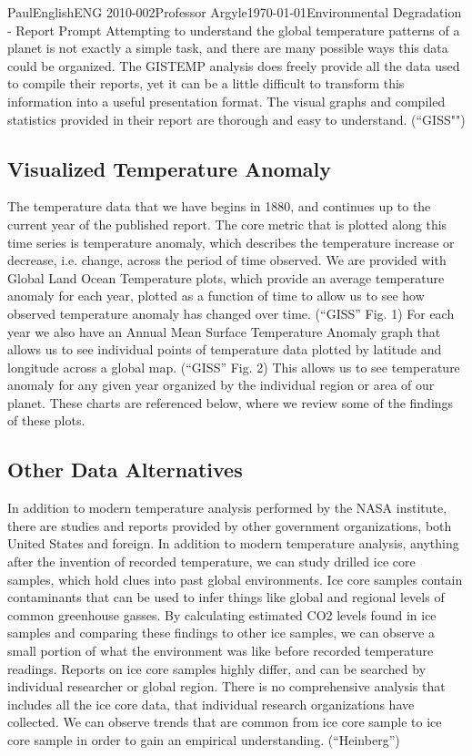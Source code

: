 \documentclass[12pt,letterpaper]{article}
\begin{document}
\begin{mla}{Paul}{English}{ENG 2010-002}{Professor Argyle}{\today}{Environmental Degradation - Report Prompt}
Attempting to understand the global temperature patterns of a planet is not exactly a simple task, and there are many possible ways this data could be organized. The GISTEMP analysis does freely provide all the data used to compile their reports, yet it can be a little difficult to transform this information into a useful presentation format. The visual graphs and compiled statistics provided in their report are thorough and easy to understand. (``GISS"")

\subsection{Visualized Temperature Anomaly}
The temperature data that we have begins in 1880, and continues up to the current year of the published report. The core metric that is plotted along this time series is temperature anomaly, which describes the temperature increase or decrease, i.e. change, across the period of time observed. We are provided with Global Land Ocean Temperature plots, which provide an average temperature anomaly for each year, plotted as a function of time to allow us to see how observed temperature anomaly has changed over time. (``GISS'' Fig. 1) For each year we also have an Annual Mean Surface Temperature Anomaly graph that allows us to see individual points of temperature data plotted by latitude and longitude across a global map. (``GISS'' Fig. 2) This allows us to see temperature anomaly for any given year organized by the individual region or area of our planet. These charts are referenced below, where we review some of the findings of these plots.

\subsection{Other Data Alternatives}
In addition to modern temperature analysis performed by the NASA institute, there are studies and reports provided by other government organizations, both United States and foreign. In addition to modern temperature analysis, anything after the invention of recorded temperature, we can study drilled ice core samples, which hold clues into past global environments. Ice core samples contain contaminants that can be used to infer things like global and regional levels of common greenhouse gasses. By calculating estimated CO2 levels found in ice samples and comparing these findings to other ice samples, we can observe a small portion of what the environment was like before recorded temperature readings. Reports on ice core samples highly differ, and can be searched by individual researcher or global region. There is no comprehensive analysis that includes all the ice core data, that individual research organizations have collected. We can observe trends that are common from ice core sample to ice core sample in order to gain an empirical understanding. (``Heinberg'')


\end{mla}
\end{document}
